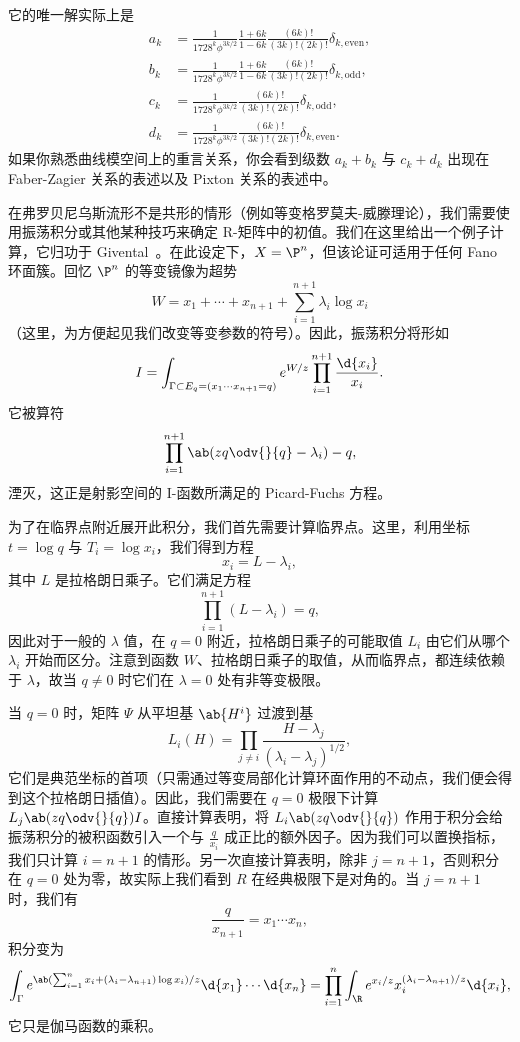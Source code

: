 它的唯一解实际上是
\begin{align*}
    a_k &= \frac{1}{1728^k \phi^{3k/2}} \frac{1+6k}{1-6k} \frac{(6k)!}{(3k)!(2k)!} \delta_{k, \text{even}},  \\
    b_k &= \frac{1}{1728^k \phi^{3k/2}} \frac{1+6k}{1-6k}\frac{(6k)!}{(3k)!(2k)!} \delta_{k, \text{odd}},  \\
    c_k &= \frac{1}{1728^k \phi^{3k/2}}\frac{(6k)!}{(3k)!(2k)!} \delta_{k, \text{odd}}, \\
    d_k &= \frac{1}{1728^k \phi^{3k/2}} \frac{(6k)!}{(3k)!(2k)!} \delta_{k, \text{even}}. 
\end{align*}
如果你熟悉曲线模空间上的重言关系，你会看到级数 \(a_k + b_k\) 与 \(c_k + d_k\) 出现在 Faber-Zagier 关系的表述以及 Pixton 关系的表述中。

在弗罗贝尼乌斯流形不是共形的情形（例如等变格罗莫夫-威滕理论），我们需要使用振荡积分或其他某种技巧来确定 R-矩阵中的初值。我们在这里给出一个例子计算，它归功于 Givental~\cite{Givental2001semisimple}。在此设定下，\(X = \P^n\)，但该论证可适用于任何 Fano 环面簇。回忆 \(\P^n\) 的等变镜像为超势
\[ W = x_1 + \cdots + x_{n+1} + \sum_{i=1}^{n+1} \lambda_i \log x_i \]
（这里，为方便起见我们改变等变参数的符号）。因此，振荡积分将形如
\[ I = \int_{\Gamma \subset E_q = (x_1 \cdots x_{n+1}=q)} e^{W/z} \prod_{i=1}^{n+1} \frac{\d{x_i}}{x_i}. \]
它被算符
\[ \prod_{i=1}^{n+1}\ab(zq \odv{}{q} -\lambda_i) - q, \]
湮灭，这正是射影空间的 I-函数所满足的 Picard-Fuchs 方程。

为了在临界点附近展开此积分，我们首先需要计算临界点。这里，利用坐标 \(t = \log q\) 与 \(T_i = \log x_i\)，我们得到方程
\[ x_i = L - \lambda_i, \]
其中 \(L\) 是拉格朗日乘子。它们满足方程
\[ \prod_{i=1}^{n+1} (L - \lambda_i) = q, \]
因此对于一般的 \(\lambda\) 值，在 \(q = 0\) 附近，拉格朗日乘子的可能取值 \(L_i\) 由它们从哪个 \(\lambda_i\) 开始而区分。注意到函数 \(W\)、拉格朗日乘子的取值，从而临界点，都连续依赖于 \(\lambda\)，故当 \(q \neq 0\) 时它们在 \(\lambda = 0\) 处有非等变极限。

当 \(q = 0\) 时，矩阵 \(\Psi\) 从平坦基 \(\ab{H^i}\) 过渡到基
\[ L_i(H) = \prod_{j \neq i} \frac{H - \lambda_j}{(\lambda_i - \lambda_j)^{1/2}}, \]
它们是典范坐标的首项（只需通过等变局部化计算环面作用的不动点，我们便会得到这个拉格朗日插值）。因此，我们需要在 \(q = 0\) 极限下计算 \(L_j \ab(z q \odv{}{q}) I\)。直接计算表明，将 \(L_i \ab(z q \odv{}{q})\) 作用于积分会给振荡积分的被积函数引入一个与 \(\frac{q}{x_i}\) 成正比的额外因子。因为我们可以置换指标，我们只计算 \(i = n+1\) 的情形。另一次直接计算表明，除非 \(j = n+1\)，否则积分在 \(q = 0\) 处为零，故实际上我们看到 \(R\) 在经典极限下是对角的。当 \(j = n+1\) 时，我们有
\[ \frac{q}{x_{n+1}} = x_1 \cdots x_n, \]
积分变为
\[ \int_{\Gamma} e^{\ab( \sum_{i=1}^n x_i + (\lambda_i - \lambda_{n+1})\log x_i ) / z} \d{x_1} \cdots \d{x_n} = \prod_{i=1}^n \int_{\R} e^{x_i/z} x_i^{(\lambda_i - \lambda_{n+1})/z} \d{x_i}, \]
它只是伽马函数的乘积。

